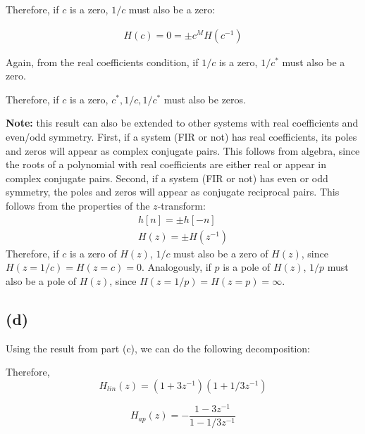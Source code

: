 \documentclass{article}
\begin{document}
Therefore, if $c$ is a zero, $1/c$ must also be a zero:

\begin{align*}
H(c) = 0 = \pm c^MH(c^{-1})
\end{align*}

Again, from the real coefficients condition, if $1/c$ is a zero, $1/c^*$ must also be a zero.

Therefore, if $c$ is a zero, $c^*, 1/c, 1/c^*$ must also be zeros.

\noindent\textbf{Note:} this result can also be extended to other systems with real coefficients and even/odd symmetry. First, if a system (FIR or not) has real coefficients, its poles and zeros will appear as complex conjugate pairs. This follows from algebra, since the roots of a polynomial with real coefficients are either real or appear in complex conjugate pairs. Second, if a system (FIR or not) has even or odd symmetry, the poles and zeros will appear as conjugate reciprocal pairs. This follows from the properties of the $z$-transform:
\begin{align}
h[n] = \pm h[-n] \tag{even or odd symmetry} \\
H(z) = \pm H(z^{-1}) \tag{time reversal property of the $z$-transform}
\end{align}
Therefore, if $c$ is a zero of $H(z)$, $1/c$ must also be a zero of $H(z)$, since $H(z = 1/c) = H(z = c) = 0$. Analogously, if $p$ is a pole of $H(z)$, $1/p$ must also be a pole of $H(z)$, since $H(z = 1/p) = H(z = p) = \infty$.

\subsection{(d)}

Using the result from part (c), we can do the following decomposition:

\begin{figure}[!h]
	\resizebox{0.9\textwidth}{!}{}
\end{figure}

Therefore,
\begin{equation}
H_{lin}(z) = (1 + 3z^{-1})(1 +1/3z^{-1})
\end{equation}

\begin{equation}
H_{ap}(z) = -\frac{1 - 3z^{-1}}{1 - 1/3z^{-1}}
\end{equation}

\newpage
\end{document}
